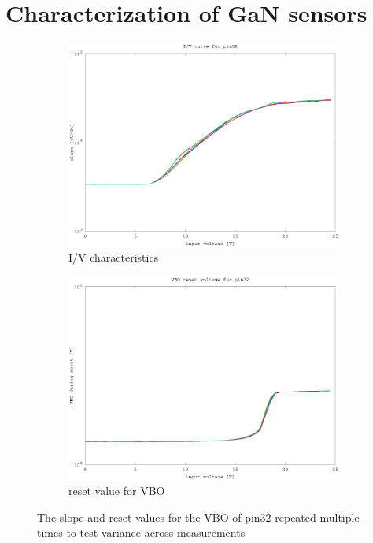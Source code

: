\documentclass{article}
\begin{document}
\clearpage



\section{Characterization of GaN sensors}

\begin{figure}[h]
	\centering
	\begin{subfigure}[b]{0.475\textwidth}
	    \centering
	    \includegraphics[width=\textwidth]{fig/pin32_slope_0-25V.eps}
	    \caption[Network2]%
	    {I/V characteristics}    
	    \label{fig:pin32_slope}
	\end{subfigure}
	\hfill
	\begin{subfigure}[b]{0.475\textwidth}  
	    \centering 
	    \includegraphics[width=\textwidth]{fig/pin32_reset_0-25V.eps}
	    \caption[]%
	    {reset value for VBO}    
	    \label{fig:pin32_reset}
	\end{subfigure}
	\caption{The slope and reset values for the VBO of pin32 repeated multiple times to test variance across measurements}
	\label{fig:pin32}
\end{figure}
\end{document}
